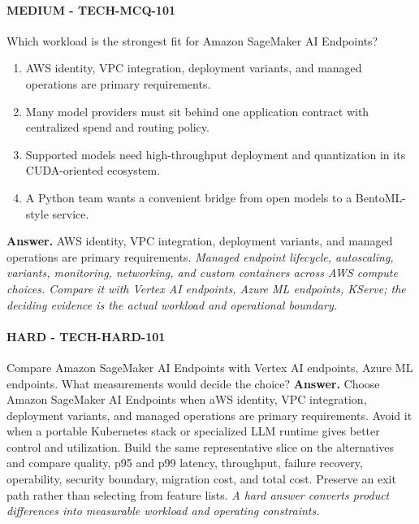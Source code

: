 \paragraph{MEDIUM - TECH-MCQ-101} Which workload is the strongest fit for Amazon SageMaker AI Endpoints?
\begin{enumerate}[label=\Alph*.]
\item AWS identity, VPC integration, deployment variants, and managed operations are primary requirements.
\item Many model providers must sit behind one application contract with centralized spend and routing policy.
\item Supported models need high-throughput deployment and quantization in its CUDA-oriented ecosystem.
\item A Python team wants a convenient bridge from open models to a BentoML-style service.
\end{enumerate}
\textbf{Answer.} AWS identity, VPC integration, deployment variants, and managed operations are primary requirements.
\textit{Managed endpoint lifecycle, autoscaling, variants, monitoring, networking, and custom containers across AWS compute choices. Compare it with Vertex AI endpoints, Azure ML endpoints, KServe; the deciding evidence is the actual workload and operational boundary.}
\paragraph{HARD - TECH-HARD-101} Compare Amazon SageMaker AI Endpoints with Vertex AI endpoints, Azure ML endpoints. What measurements would decide the choice?
\textbf{Answer.} Choose Amazon SageMaker AI Endpoints when aWS identity, VPC integration, deployment variants, and managed operations are primary requirements. Avoid it when a portable Kubernetes stack or specialized LLM runtime gives better control and utilization. Build the same representative slice on the alternatives and compare quality, p95 and p99 latency, throughput, failure recovery, operability, security boundary, migration cost, and total cost. Preserve an exit path rather than selecting from feature lists.
\textit{A hard answer converts product differences into measurable workload and operating constraints.}
